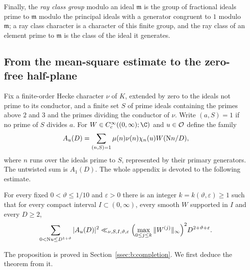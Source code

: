 Finally, the \emph{ray class group} modulo an ideal $\mathfrak m$ is the group of fractional ideals prime to $\mathfrak m$ modulo the principal ideals with a generator congruent to $1$ modulo $\mathfrak m$; a ray class character is a character of this finite group, and the ray class of an element prime to $\mathfrak m$ is the class of the ideal it generates.

\subsection{From the mean-square estimate to the zero-free half-plane}\label{ssec:b:reduction}

Fix a finite-order Hecke character $\nu$ of $K$, extended by zero to the ideals not prime to its conductor, and a finite set $S$ of prime ideals containing the primes above $2$ and $3$ and the primes dividing the conductor of $\nu$. Write $(a,S)=1$ if no prime of $S$ divides $a$. For $W\in C_c^\infty((0,\infty);\C)$ and $u\in\mathcal{O}$ define the family
\begin{equation}\label{eq:b:family}
  A_u(D)=\sum_{(n,S)=1}\mu(n)\nu(n)\chi_n(u)W(\mathrm{N} n/D),
\end{equation}
where $n$ runs over the ideals prime to $S$, represented by their primary generators. The untwisted sum is $A_1(D)$. The whole appendix is devoted to the following estimate.

\begin{proposition}\label{prop:b:ms}
For every fixed $0<\vartheta\le1/10$ and $\varepsilon>0$ there is an integer $k=k(\vartheta,\varepsilon)\ge1$ such that for every compact interval $I\subset(0,\infty)$, every smooth $W$ supported in $I$ and every $D\ge2$,
\begin{equation}\label{eq:b:ms}
  \sum_{0<\mathrm{N} u\le D^{1+\vartheta}}|A_u(D)|^2\ll_{\nu,S,I,\vartheta,\varepsilon}\Bigl(\max_{0\le j\le k}\|W^{(j)}\|_\infty\Bigr)^2D^{2+\vartheta+\varepsilon}.
\end{equation}
\end{proposition}

The proposition is proved in Section~\ref{ssec:b:completion}. We first deduce the theorem from it.

